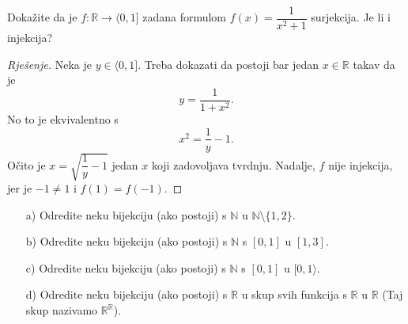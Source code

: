 \begin{exercise}
Dokažite da je $f : \mathbb{R}\to \langle 0, 1]$ zadana formulom $f(x)=\dfrac{1}{x^2+1}$ surjekcija. Je li i injekcija?
\end{exercise}
\begin{proof}[Rješenje]
Neka je $y\in \langle 0, 1]$. Treba dokazati da postoji bar jedan $x\in \mathbb{R}$ takav da je $$y=\dfrac{1}{1+x^2}.$$ No to je ekvivalentno s $$x^2=\dfrac{1}{y}-1.$$ 
Očito je $x=\sqrt{\dfrac{1}{y}-1}$ jedan $x$ koji zadovoljava tvrdnju. Nadalje, $f$ nije injekcija, jer je $-1\neq 1$ i $f(1)=f(-1)$.
\end{proof}
\begin{exercise} \textbf{}
\label{bijexmp}
\begin{itemize}
\item[a)] Odredite neku bijekciju (ako postoji) s $\mathbb{N}$ u $\mathbb{N}\setminus\{1, 2\}$.
\item[b)] Odredite neku bijekciju (ako postoji) s $\mathbb{N}$ s $[0, 1]$ u $[1, 3]$.
\item[c)] Odredite neku bijekciju (ako postoji) s $\mathbb{N}$ s $[0, 1]$ u $[0, 1\rangle$.
\item[d)] Odredite neku bijekciju (ako postoji) s $\mathbb{R}$ u skup svih funkcija s $\mathbb{R}$ u $\mathbb{R}$ (Taj skup nazivamo $\mathbb{R}^\mathbb{R}$).
\end{itemize}
\end{exercise}
